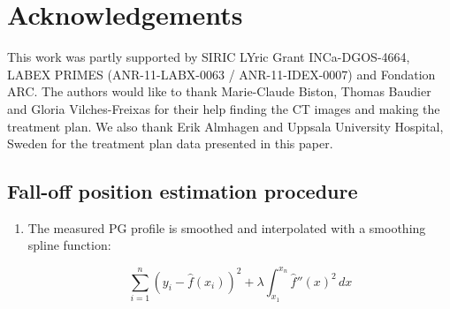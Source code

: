 \documentclass[a4paper,english]{article}
\begin{document}
\section{Acknowledgements}

This work was partly supported by SIRIC LYric Grant INCa-DGOS-4664, LABEX PRIMES (ANR-11-LABX-0063 / ANR-11-IDEX-0007) and Fondation ARC. The authors would like to thank Marie-Claude Biston, Thomas Baudier and Gloria Vilches-Freixas for their help finding the CT images and making the treatment plan. We also thank Erik Almhagen and Uppsala University Hospital, Sweden for the treatment plan data presented in this paper.

\newpage
\begin{appendices}


\section{Fall-off position estimation procedure}\label{sec:fopproc}

\begin{enumerate}[noitemsep]
\item The measured PG profile is smoothed and interpolated with a smoothing spline function:

\begin{equation}
\sum_{i=1}^n (y_i - \hat f(x_i))^2 + \lambda \int_{x_1}^{x_n} \hat f''(x)^2 \,dx
\end{equation}


\end{enumerate}
\end{appendices}
\end{document}
